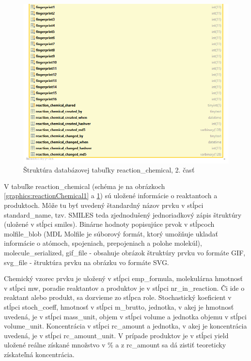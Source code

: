 \documentclass[thesis=M,slovak]{FITthesis}[2013/05/06]
\begin{document}
\begin{figure}\centering
	\includegraphics[width=1.0\textwidth]{Schema_DB_Open_Enventory/reaction_chemical_2.png}
 	\caption[Štruktúra databázovej tabuľky reaction\_chemical, 2. časť]{Štruktúra databázovej tabuľky reaction\_chemical, 2. časť}\label{graphics:reactionChemical2}
\end{figure}

V tabuľke reaction\_chemical (schéma je na obrázkoch \ref{graphics:reactionChemical1} a \ref{graphics:reactionChemical2}) sú uložené informácie o reaktantoch a produktoch. Môže tu byť uvedený štandardný názov prvku v stĺpci standard\_name, tzv. SMILES teda zjednodušený jednoriadkový zápis štruktúry (uložené v stĺpci smiles). Binárne hodnoty popisujúce prvok v stĺpcoch molfile\_blob (MDL Molfile je súborový formát, ktorý umožňuje ukladať informácie o atómoch, spojeniach, prepojeniach a polohe molekúl), molecule\_serialized, gif\_file - obsahuje obrázok štruktúry prvku vo formáte GIF, svg\_file - štruktúra prvku na obrázku vo formáte SVG.

Chemický vzorec prvku je uložený v stĺpci emp\_formula, molekulárna hmotnosť v stĺpci mw, poradie reaktantov a produktov je v stĺpci nr\_in\_reaction. Či ide o reaktant alebo produkt, sa dozvieme zo stĺpca role. Stochastický koeficient v stĺpci stoch\_coeff, hmotnosť v stĺpci m\_brutto, jednotka, v akej je hmotnosť uvedená, je v stĺpci mass\_unit, objem v stĺpci volume a jednotka objemu v stĺpci volume\_unit. Koncentrácia v stĺpci rc\_amount a jednotka, v akej je koncentrácia uvedená, je v stĺpci rc\_amount\_unit.
V prípade produktov je v stĺpci yield uložené reálne získané množstvo v \% a z rc\_amount sa dá zistiť teoreticky získateľná koncentrácia.
\end{document}
